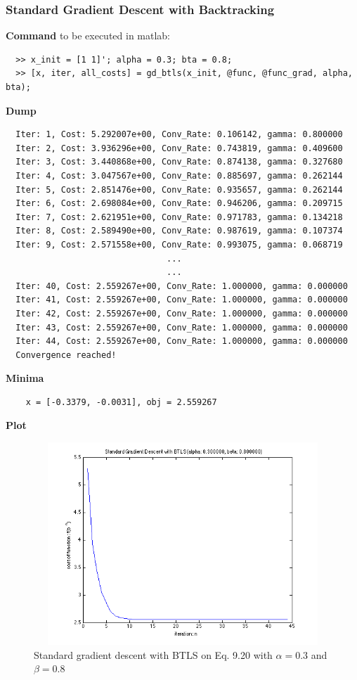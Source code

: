 \documentclass[11pt,a4paper]{article}
\begin{document}
\subsubsection{Standard Gradient Descent with Backtracking}
{\bf Command} to be executed in matlab:
\begin{verbatim}
  >> x_init = [1 1]'; alpha = 0.3; bta = 0.8;
  >> [x, iter, all_costs] = gd_btls(x_init, @func, @func_grad, alpha, bta);
\end{verbatim}
{\bf Dump}
\begin{verbatim}
  Iter: 1, Cost: 5.292007e+00, Conv_Rate: 0.106142, gamma: 0.800000
  Iter: 2, Cost: 3.936296e+00, Conv_Rate: 0.743819, gamma: 0.409600
  Iter: 3, Cost: 3.440868e+00, Conv_Rate: 0.874138, gamma: 0.327680
  Iter: 4, Cost: 3.047567e+00, Conv_Rate: 0.885697, gamma: 0.262144
  Iter: 5, Cost: 2.851476e+00, Conv_Rate: 0.935657, gamma: 0.262144
  Iter: 6, Cost: 2.698084e+00, Conv_Rate: 0.946206, gamma: 0.209715
  Iter: 7, Cost: 2.621951e+00, Conv_Rate: 0.971783, gamma: 0.134218
  Iter: 8, Cost: 2.589490e+00, Conv_Rate: 0.987619, gamma: 0.107374
  Iter: 9, Cost: 2.571558e+00, Conv_Rate: 0.993075, gamma: 0.068719
                                ...
                                ...
  Iter: 40, Cost: 2.559267e+00, Conv_Rate: 1.000000, gamma: 0.000000
  Iter: 41, Cost: 2.559267e+00, Conv_Rate: 1.000000, gamma: 0.000000
  Iter: 42, Cost: 2.559267e+00, Conv_Rate: 1.000000, gamma: 0.000000
  Iter: 43, Cost: 2.559267e+00, Conv_Rate: 1.000000, gamma: 0.000000
  Iter: 44, Cost: 2.559267e+00, Conv_Rate: 1.000000, gamma: 0.000000
  Convergence reached!
\end{verbatim}
{\bf Minima}
\begin{verbatim}
    x = [-0.3379, -0.0031], obj = 2.559267 
   \end{verbatim}
{\bf Plot}
\begin{figure}[h]
    \centering
    \includegraphics[width=5in,height=3in]{../ps2_matlab/1.png}
    \caption{Standard gradient descent with BTLS on
        Eq. 9.20 with $\alpha = 0.3$ and $\beta = 0.8$}
\end{figure}
\end{document}
